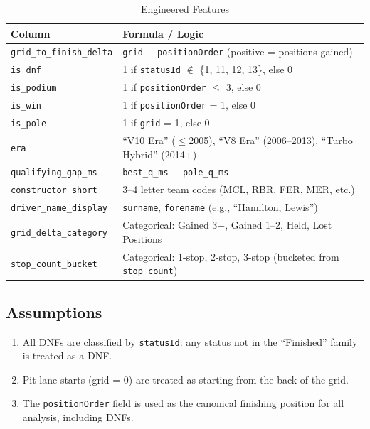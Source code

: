 \documentclass[12pt, a4paper]{article}
\begin{document}
\begin{table}[H]
\centering
\caption{Engineered Features}
\begin{tabular}{l l}
\toprule
\textbf{Column} & \textbf{Formula / Logic} \\
\midrule
\texttt{grid\_to\_finish\_delta} & \texttt{grid} $-$ \texttt{positionOrder} (positive = positions gained) \\
\texttt{is\_dnf}             & 1 if \texttt{statusId} $\notin$ \{1, 11, 12, 13\}, else 0 \\
\texttt{is\_podium}          & 1 if \texttt{positionOrder} $\leq$ 3, else 0 \\
\texttt{is\_win}             & 1 if \texttt{positionOrder} = 1, else 0 \\
\texttt{is\_pole}            & 1 if \texttt{grid} = 1, else 0 \\
\texttt{era}                 & ``V10 Era'' ($\leq$2005), ``V8 Era'' (2006--2013), ``Turbo Hybrid'' (2014+) \\
\texttt{qualifying\_gap\_ms} & \texttt{best\_q\_ms} $-$ \texttt{pole\_q\_ms} \\
\texttt{constructor\_short}  & 3--4 letter team codes (MCL, RBR, FER, MER, etc.) \\
\texttt{driver\_name\_display} & \texttt{surname}, \texttt{forename} (e.g., ``Hamilton, Lewis'') \\
\texttt{grid\_delta\_category} & Categorical: Gained 3+, Gained 1--2, Held, Lost Positions \\
\texttt{stop\_count\_bucket} & Categorical: 1-stop, 2-stop, 3-stop (bucketed from \texttt{stop\_count}) \\
\bottomrule
\end{tabular}
\end{table}

\subsection{Assumptions}
\begin{enumerate}
    \item All DNFs are classified by \texttt{statusId}: any status not in the ``Finished'' family is treated as a DNF.
    \item Pit-lane starts (grid = 0) are treated as starting from the back of the grid.
    \item The \texttt{positionOrder} field is used as the canonical finishing position for all analysis, including DNFs.
\end{enumerate}
\end{document}
